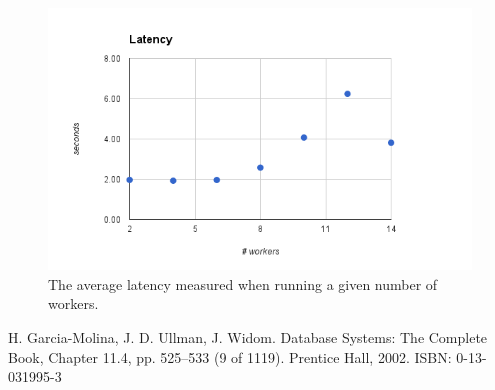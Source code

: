 \documentclass[a4paper, 11pt]{article}
\begin{document}
\begin{figure}[H]
  \centering
  \includegraphics[width=1\textwidth]{chart_2.png}
  \caption{The average latency measured when running a given number of workers.}
  \label{fig:latency}
\end{figure}




\begin{thebibliography}{9}

    H. Garcia-Molina, J. D. Ullman, J. Widom.
    Database Systems: The Complete Book,
    Chapter 11.4, pp. 525–533 (9 of 1119).
    Prentice Hall, 2002.
    ISBN: 0-13-031995-3
\end{thebibliography}

\end{document}
